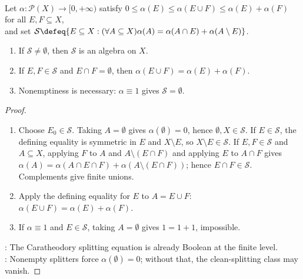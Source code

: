 \begin{proposition} \label{prop:caratheodory-splitters-finite-subadditive-size} \\
Let $\alpha:\mathcal{P}(X)\to[0,+\infty)$ satisfy $0\leq\alpha(E)\leq\alpha(E\cup F)\leq\alpha(E)+\alpha(F)$ for all $E,F\subseteq X$,\\
and set $\mathcal{S}\defeq\{E\subseteq X:(\forall A\subseteq X)\alpha(A)=\alpha(A\cap E)+\alpha(A\setminus E)\}$.
\begin{enumerate}[label=(\roman*)]
\setlength{\itemsep}{0pt}
\item If $\mathcal{S}\neq\emptyset$, then $\mathcal{S}$ is an algebra on $X$.
\item If $E,F\in\mathcal{S}$ and $E\cap F=\emptyset$, then $\alpha(E\cup F)=\alpha(E)+\alpha(F)$.
\item Nonemptiness is necessary: $\alpha\equiv1$ gives $\mathcal{S}=\emptyset$.
\end{enumerate}
\begin{proof}
\begin{enumerate}[label=(\roman*)]
\setlength{\itemsep}{0pt}
\item Choose $E_0\in\mathcal{S}$. Taking $A=\emptyset$ gives $\alpha(\emptyset)=0$, hence $\emptyset,X\in\mathcal{S}$. If $E\in\mathcal{S}$, the defining equality is symmetric in $E$ and $X\setminus E$, so $X\setminus E\in\mathcal{S}$. If $E,F\in\mathcal{S}$ and $A\subseteq X$, applying $F$ to $A$ and $A\setminus(E\cap F)$ and applying $E$ to $A\cap F$ gives $\alpha(A)=\alpha(A\cap E\cap F)+\alpha(A\setminus(E\cap F))$; hence $E\cap F\in\mathcal{S}$. Complements give finite unions.
\item Apply the defining equality for $E$ to $A=E\cup F$: $\alpha(E\cup F)=\alpha(E)+\alpha(F)$.
\item If $\alpha\equiv1$ and $E\in\mathcal{S}$, taking $A=\emptyset$ gives $1=1+1$, impossible.
\end{enumerate}
: The Caratheodory splitting equation is already Boolean at the finite level.\\
: Nonempty splitters force $\alpha(\emptyset)=0$; without that, the clean-splitting class may vanish.
\end{proof}
\end{proposition}

